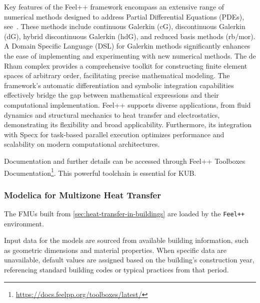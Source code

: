 \documentclass[runningheads]{llncs}
\begin{document}
Key features of the Feel++ framework encompass an extensive range of numerical methods designed to address Partial Differential Equations (PDEs), see~\cite{christophe_prudhomme_feelppfeelpp_2024}. 
These methods include continuous Galerkin (cG), discontinuous Galerkin (dG), hybrid discontinuous Galerkin (hdG), and reduced basis methods (rb/mor). 
A Domain Specific Language (DSL) for Galerkin methods significantly enhances the ease of implementing and experimenting with new numerical methods. 
The de Rham complex provides a comprehensive toolkit for constructing finite element spaces of arbitrary order, facilitating precise mathematical modeling. 
The framework's automatic differentiation and symbolic integration capabilities effectively bridge the gap between mathematical expressions and their computational implementation.
Feel++ supports diverse applications, from fluid dynamics and structural mechanics to heat transfer and electrostatics, demonstrating its flexibility and broad applicability.
Furthermore, its integration with Specx for task-based parallel execution optimizes performance and scalability on modern computational architectures.


Documentation and further details can be accessed through Feel++ Toolboxes Documentation\footnote{\url{https://docs.feelpp.org/toolboxes/latest/}}.
This powerful toolchain is essential for KUB.

\subsubsection{Modelica for Multizone Heat Transfer}

The FMUs built from \cref{sec:heat-transfer-in-buildings} are loaded by the \texttt{Feel++} environment.

Input data for the models are sourced from available building information, such as geometric dimensions and material properties.
When specific data are unavailable, default values are assigned based on the building's construction year, referencing standard building codes or typical practices from that period.
\end{document}
